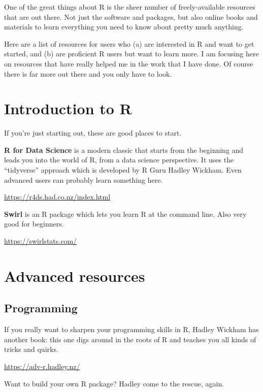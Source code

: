 \documentclass[
]{book}
\begin{document}
One of the great things about R is the sheer number of freely-available resources that are out there. Not just the software and packages, but also online books and materials to learn everything you need to know about pretty much anything.

Here are a list of resources for users who (a) are interested in R and want to get started, and (b) are proficient R users but want to learn more. I am focusing here on resources that have really helped me in the work that I have done. Of course there is far more out there and you only have to look.

\hypertarget{introduction-to-r}{%
\section{Introduction to R}\label{introduction-to-r}}

If you're just starting out, these are good places to start.

\textbf{R for Data Science} is a modern classic that starts from the beginning and leads you into the world of R, from a data science perspective. It uses the ``tidyverse'' approach which is developed by R Guru Hadley Wickham. Even advanced users can probably learn something here.

\url{https://r4ds.had.co.nz/index.html}

\textbf{Swirl} is an R package which lets you learn R at the command line. Also very good for beginners.

\url{https://swirlstats.com/}

\hypertarget{advanced-resources}{%
\section{Advanced resources}\label{advanced-resources}}

\hypertarget{programming}{%
\subsection{Programming}\label{programming}}

If you really want to sharpen your programming skills in R, Hadley Wickham has another book: this one digs around in the roots of R and teaches you all kinds of tricks and quirks.

\url{https://adv-r.hadley.nz/}

Want to build your own R package? Hadley come to the rescue, again.
\end{document}
